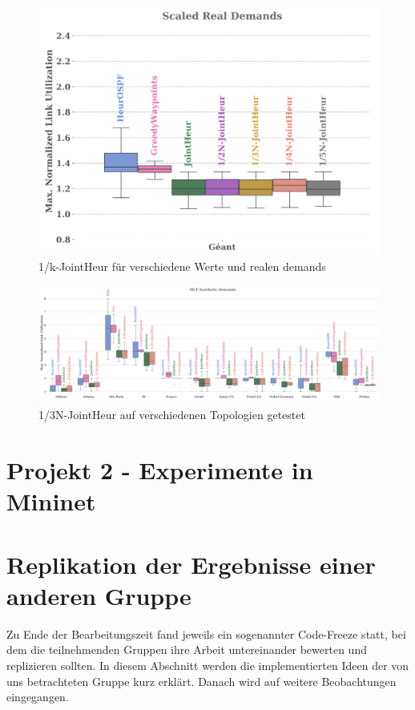 \documentclass[sigconf]{acmart}
\begin{document}
\begin{figure}[h]
  \centering
  \includegraphics[width=\linewidth]{abbildungen/a32}
  \caption{1/k-JointHeur für verschiedene Werte und realen demands}
\end{figure}


\begin{figure}[h]
  \centering
  \includegraphics[width=\linewidth]{abbildungen/a33}
  \caption{1/3N-JointHeur auf verschiedenen Topologien getestet}
\end{figure}



\section{Projekt 2 - Experimente in Mininet}

\section{Replikation der Ergebnisse einer anderen Gruppe}
Zu Ende der Bearbeitungszeit fand jeweils ein sogenannter Code-Freeze statt, bei dem die teilnehmenden 
Gruppen ihre Arbeit untereinander bewerten und replizieren sollten. In diesem Abschnitt werden die implementierten Ideen
der von uns betrachteten Gruppe kurz erklärt. Danach wird auf weitere Beobachtungen eingegangen.
\end{document}
